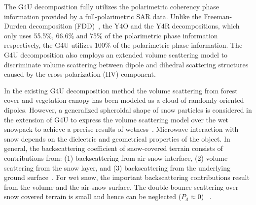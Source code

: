 The G4U decomposition fully utilizes the polarimetric coherency phase information provided by a full-polarimetric SAR data. Unlike the Freeman-Durden decomposition (FDD)~\citep{freeman98}, the Y4O and the Y4R decompositions, which only uses 55.5$\%$, 66.6$\%$ and 75$\%$ of the polarimetric phase information respectively, the G4U utilizes 100$\%$ of the polarimetric phase information. The G4U decomposition also employs an extended volume scattering model to discriminate volume scattering between dipole and dihedral scattering structures caused by the cross-polarization (HV) component.

In the existing G4U decomposition method the volume scattering from forest cover and vegetation canopy has been modeled as a cloud of randomly oriented dipoles. However, a generalized spheroidal shape of snow particles is considered in the extension of G4U to express the volume scattering model over the wet snowpack to achieve a precise results of wetness~\citep{singh2013b}. Microwave interaction with snow depends on the dielectric and geometrical properties of the object. In general, the backscattering coefficient of snow-covered terrain consists of contributions from: (1) backscattering from air-snow interface, (2) volume scattering from the snow layer, and (3) backscattering from the underlying ground surface~\citep{ulaby1986microwave}. For wet snow, the important backscattering contributions result from the volume and the air-snow surface. The double-bounce scattering over snow covered terrain is small and hence can be neglected ($P_d\approx0$) ~\citep{singh2013b}.  

